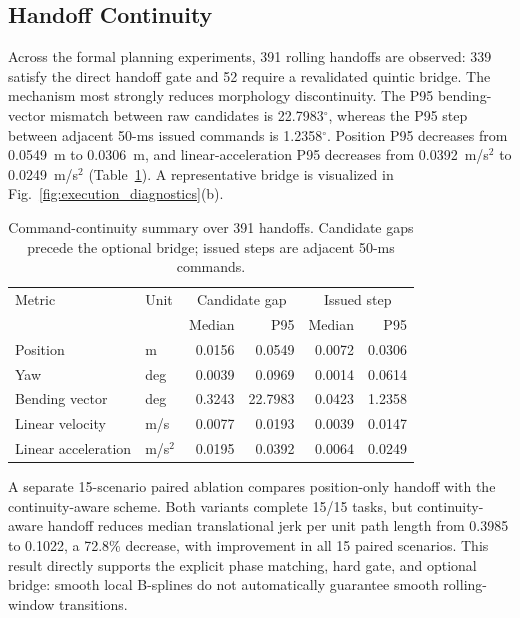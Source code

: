 \documentclass[journal,twoside]{IEEEtran}
\begin{document}
\subsection{Handoff Continuity}
Across the formal planning experiments, 391 rolling handoffs are observed: 339 satisfy the direct handoff gate and 52 require a revalidated quintic bridge. The mechanism most strongly reduces morphology discontinuity. The P95 bending-vector mismatch between raw candidates is 22.7983$^\circ$, whereas the P95 step between adjacent 50-ms issued commands is 1.2358$^\circ$. Position P95 decreases from 0.0549~m to 0.0306~m, and linear-acceleration P95 decreases from 0.0392~m/s$^2$ to 0.0249~m/s$^2$ (Table~\ref{tab:handoff_continuity}). A representative bridge is visualized in Fig.~\ref{fig:execution_diagnostics}(b).

\begin{table}[t]
\centering
\caption{Command-continuity summary over 391 handoffs. Candidate gaps precede the optional bridge; issued steps are adjacent 50-ms commands.}
\label{tab:handoff_continuity}
\setlength{\tabcolsep}{2.6pt}
\begin{tabular}{llrr|rr}
\toprule
Metric & Unit & \multicolumn{2}{c|}{Candidate gap} & \multicolumn{2}{c}{Issued step} \\
 & & Median & P95 & Median & P95 \\
\midrule
Position & m & 0.0156 & 0.0549 & 0.0072 & 0.0306 \\
Yaw & deg & 0.0039 & 0.0969 & 0.0014 & 0.0614 \\
Bending vector & deg & 0.3243 & 22.7983 & 0.0423 & 1.2358 \\
Linear velocity & m/s & 0.0077 & 0.0193 & 0.0039 & 0.0147 \\
Linear acceleration & m/s$^2$ & 0.0195 & 0.0392 & 0.0064 & 0.0249 \\
\bottomrule
\end{tabular}
\end{table}

A separate 15-scenario paired ablation compares position-only handoff with the continuity-aware scheme. Both variants complete 15/15 tasks, but continuity-aware handoff reduces median translational jerk per unit path length from 0.3985 to 0.1022, a 72.8\% decrease, with improvement in all 15 paired scenarios. This result directly supports the explicit phase matching, hard gate, and optional bridge: smooth local B-splines do not automatically guarantee smooth rolling-window transitions.
\end{document}
